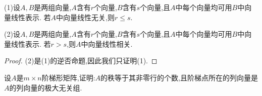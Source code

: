 \documentclass[lang=cn,newtx,10pt,scheme=chinese]{elegantbook}
\begin{document}
\begin{theorem}\label{theorem:向量的线性关系定理2}
    (1)设\(A,B\)是两组向量,\(A\)含有\(r\)个向量,\(B\)含有\(s\)个向量,且\(A\)中每个向量均可用\(B\)中向量线性表示. 若\(A\)中向量线性无关,则\(r\leq s\).
    
    (2)设\(A,B\)是两组向量,\(A\)含有\(r\)个向量,\(B\)含有\(s\)个向量,且\(A\)中每个向量均可用\(B\)中向量线性表示. 若\(r > s\),则\(A\)中向量线性相关.
\end{theorem}
\begin{proof}
    (2)是(1)的逆否命题,因此我们只证明(1).
\end{proof}



\begin{proposition}\label{proposition:阶梯形矩阵的非零行对应其列向量的极大无关组}
设\(A\)是\(m\times n\)阶梯形矩阵,证明:\(A\)的秩等于其非零行的个数,且阶梯点所在的列向量是\(A\)的列向量的极大无关组.
\end{proposition}
\end{document}
